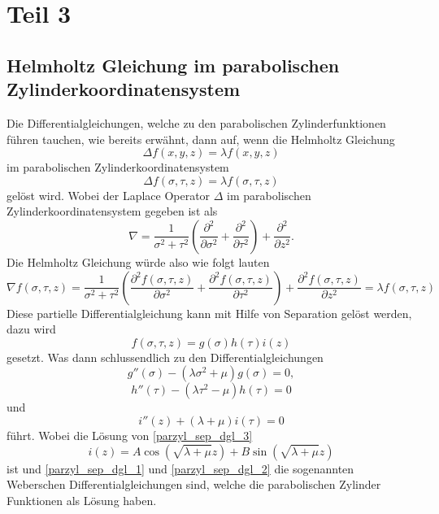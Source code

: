 %
%
%
\section{Teil 3
\label{parzyl:section:teil3}}
\subsection{Helmholtz Gleichung im parabolischen Zylinderkoordinatensystem
\label{parzyl:subsection:malorum}}
Die Differentialgleichungen, welche zu den parabolischen Zylinderfunktionen führen tauchen, wie bereits erwähnt, dann auf, wenn die Helmholtz Gleichung
\begin{equation}
	\Delta f(x,y,z) = \lambda f(x,y,z) 
\end{equation}
im parabolischen Zylinderkoordinatensystem
\begin{equation}
	\Delta f(\sigma,\tau,z) = \lambda f(\sigma,\tau,z) 
\end{equation}
gelöst wird.
Wobei der Laplace Operator $\Delta$ im parabolischen Zylinderkoordinatensystem gegeben ist als
\begin{equation}
	\nabla 
	= 
	\frac{1}{\sigma^2 + \tau^2}
	\left ( 
	\frac{\partial^2}{\partial \sigma^2} 
	+ 
	\frac{\partial^2}{\partial \tau^2}
	\right )
	+ 
	\frac{\partial^2}{\partial z^2}.
\end{equation}
Die Helmholtz Gleichung würde also wie folgt lauten
\begin{equation}
	\nabla f(\sigma, \tau, z)
	=
	\frac{1}{\sigma^2 + \tau^2}
	\left ( 
	\frac{\partial^2 f(\sigma,\tau,z)}{\partial \sigma^2} 
	+ 
	\frac{\partial^2 f(\sigma,\tau,z)}{\partial \tau^2}
	\right )
	+ 
	\frac{\partial^2 f(\sigma,\tau,z)}{\partial z^2}
	= 
	\lambda f(\sigma,\tau,z)
\end{equation}
Diese partielle Differentialgleichung kann mit Hilfe von Separation gelöst werden, dazu wird 
\begin{equation}
	f(\sigma,\tau,z) = g(\sigma)h(\tau)i(z)
\end{equation}
gesetzt. 
Was dann schlussendlich zu den Differentialgleichungen 
\begin{equation}\label{parzyl_sep_dgl_1}
	g''(\sigma) 
	- 
	\left (
	\lambda\sigma^2
	+
	\mu 
	\right )
	g(\sigma)
	=
	0,
\end{equation}
\begin{equation}\label{parzyl_sep_dgl_2}
	h''(\tau) 
	- 
	\left (
	\lambda\tau^2
	-
	\mu 
	\right )
	h(\tau)
	=
	0
\end{equation}
und
\begin{equation}\label{parzyl_sep_dgl_3}
	i''(z) 
	+
	\left (
	\lambda
	+
	\mu 
	\right )
	i(\tau)
	=
	0
\end{equation}
führt.
Wobei die Lösung von \ref{parzyl_sep_dgl_3}
\begin{equation}
	i(z) 
	= 
	A\cos{ 
		\left ( 
		\sqrt{\lambda + \mu}z
		\right )}
	+
	B\sin{ 
		\left ( 
		\sqrt{\lambda + \mu}z
		\right )}
\end{equation}
ist und \ref{parzyl_sep_dgl_1} und \ref{parzyl_sep_dgl_2} die sogenannten Weberschen Differentialgleichungen sind, welche die parabolischen Zylinder Funktionen als Lösung haben.
